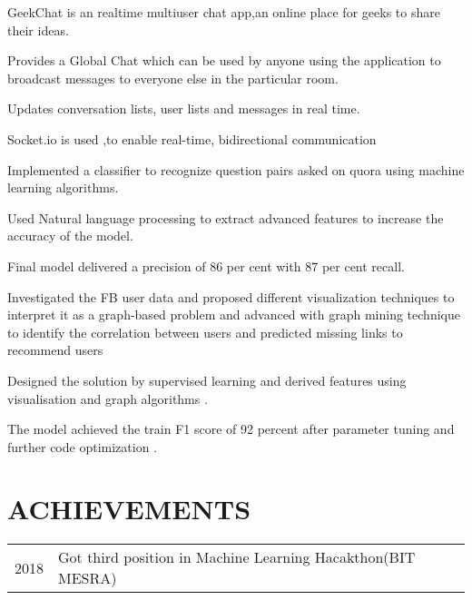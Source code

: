 \documentclass[]{deedy-resume-openfont}
\begin{document}
\begin{minipage}[t]{0.66\textwidth}
GeekChat is an realtime multiuser chat app,an online place for geeks to share their
ideas.
\begin{tightemize}
\item Provides a Global Chat which can be used by anyone using the application to
broadcast messages to everyone else in the particular room.
\item Updates conversation lists, user lists and messages in real time.
\item Socket.io is used ,to enable real-time, bidirectional communication
\end{tightemize}
\sectionsep

Implemented a classifier to recognize question pairs asked on quora using machine
learning algorithms.
\begin{tightemize}
\item Used Natural language processing to extract advanced features to increase the
accuracy of the model.
\item Final model delivered a precision of 86 per cent with 87 per cent recall.
\end{tightemize}
\sectionsep


Investigated the FB user data and proposed different visualization techniques to
interpret it as a graph-based problem and advanced with graph mining technique to
identify the correlation between users and predicted missing links to recommend
users
\begin{tightemize}
\item Designed the solution by supervised learning and derived features using
visualisation and graph algorithms .
\item The model achieved the train F1 score of 92 percent after parameter tuning
and further code optimization .
\end{tightemize}
\sectionsep



\section{ACHIEVEMENTS} 
\begin{tabular}{rll}
2018	    & Got third position in Machine Learning Hacakthon(BIT MESRA)\\

\end{tabular}
\sectionsep



\end{minipage} 
\end{document}
